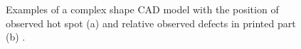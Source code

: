 \begin{figure}
    \centering
    \qquad
    \caption[Examples of hot spot defects.]{Examples of a complex shape CAD model with the position of observed hot spot (a) and relative observed defects in printed part (b) \cite{grasso_-process_2017}.}
\end{figure}

